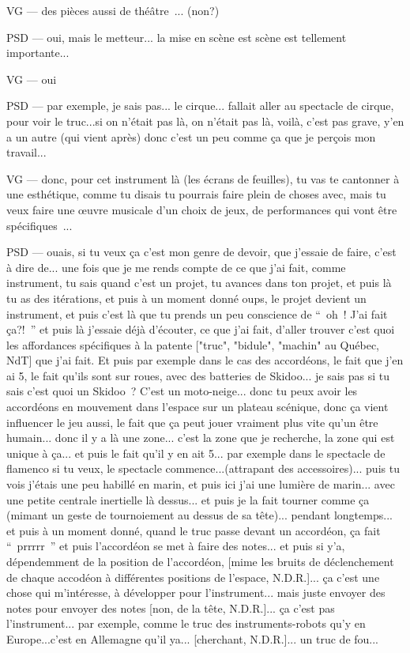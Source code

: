 VG — des pièces aussi de théâtre ... (non?)

PSD — oui, mais le metteur... la mise en scène est scène est tellement importante... 

VG — oui

PSD — par exemple, je sais pas... le cirque... fallait aller au spectacle de cirque, pour voir le truc...si on n'était pas là, on n'était pas là, voilà, c'est pas grave, y'en a un autre (qui vient après) donc c'est un peu comme ça que je perçois mon travail... 

VG — donc, pour cet instrument là (les écrans de feuilles), tu vas te cantonner à une esthétique, comme tu disais tu pourrais faire plein de choses avec, mais tu veux faire une œuvre musicale d'un choix de jeux, de performances qui vont être spécifiques ...

PSD — ouais, si tu veux ça c'est mon genre de devoir, que j'essaie de faire, c'est à dire de... une fois que je me rends compte de ce que j'ai fait, comme instrument, tu sais quand c'est un projet, tu avances dans ton projet, et puis là tu as des itérations, et puis à un moment donné oups, le projet devient un instrument, et puis c'est là que tu prends un peu conscience de “ oh ! J'ai fait ça?! ” et puis là j'essaie déjà d'écouter, ce que j'ai fait, d'aller trouver c'est quoi les affordances spécifiques à la patente ["truc", "bidule", "machin" au Québec,  NdT] que j'ai fait. Et puis par exemple dans le cas des accordéons, le fait que j'en ai 5, le fait qu'ils sont sur roues, avec des batteries de Skidoo... je sais pas si tu sais c'est quoi un Skidoo ? C'est un moto-neige... donc tu peux avoir les accordéons en mouvement dans l'espace sur un plateau scénique, donc ça vient influencer le jeu aussi, le fait que ça peut jouer vraiment plus vite qu'un être humain... donc il y a là une zone... c'est la zone que je recherche, la zone qui est unique à ça... et puis le fait qu'il y en ait 5... par exemple dans le spectacle de flamenco si tu veux, le spectacle commence...(attrapant des accessoires)... puis tu vois j'étais une peu habillé en marin, et puis ici j'ai une lumière de marin... avec une petite centrale inertielle là dessus... et puis je la fait tourner comme ça (mimant un geste de tournoiement au dessus de sa tête)... pendant longtemps... et puis à un moment donné, quand le truc passe devant un accordéon, ça fait “ prrrrr ” et puis l'accordéon se met à faire des notes... et puis si y'a, dépendemment de la position de l'accordéon, [mime les bruits de déclenchement de chaque accodéon à différentes positions de l'espace, N.D.R.]... ça c'est une chose qui m'intéresse, à développer pour l'instrument... mais juste envoyer des notes pour envoyer des notes [non, de la tête, N.D.R.]... ça c'est pas l'instrument... par exemple, comme le truc des instruments-robots qu'y en Europe...c'est en Allemagne qu'il ya... [cherchant, N.D.R.]... un truc de fou... 

